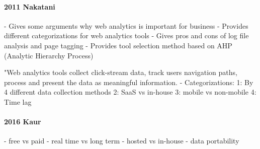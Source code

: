

\paragraph{2011 Nakatani}

- Gives some arguments why web analytics is important for business
- Provides different categorizations for web analytics tools
- Gives pros and cons of log file analysis and page tagging
- Provides tool selection method based on AHP (Analytic Hierarchy Process)

"Web analytics tools collect click-stream data, track users navigation paths, process and present the data as meaningful information.
- Categorizations:
1: By 4 different data collection methods
2: SaaS vs in-house
3: mobile vs non-mobile
4: Time lag












\paragraph{2016 Kaur}







- free vs paid
- real time vs long term
- hosted vs in-house
- data portability









